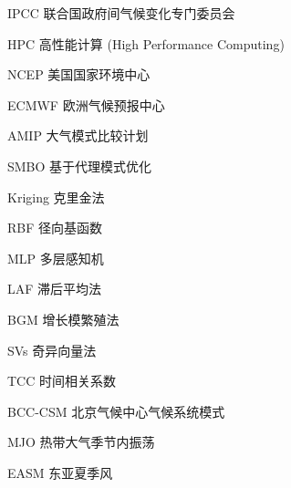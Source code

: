 \begin{denotation}[3cm]
\item[IPCC] 联合国政府间⽓候变化专门委员会
\item[HPC] 高性能计算 (High Performance Computing)
\item[NCEP] 美国国家环境中心
\item[ECMWF] 欧洲气候预报中心
\item[AMIP] ⼤⽓模式⽐较计划
\item[SMBO] 基于代理模式优化
\item[Kriging] 克里金法
\item[RBF] 径向基函数
\item[MLP] 多层感知机
\item[LAF] 滞后平均法
\item[BGM] 增长模繁殖法
\item[SVs] 奇异向量法
\item[TCC] 时间相关系数
\item[BCC-CSM] 北京气候中心气候系统模式
\item[MJO] 热带大气季节内振荡
\item[EASM] 东亚夏季风
\end{denotation}





